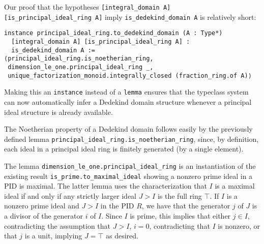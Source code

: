 \documentclass[a4paper,USenglish,cleveref, autoref, thm-restate]{lipics-v2021}
\newcommand{\lean}[1]{\texttt{#1}\xspace} %
\begin{document}
Our proof that the hypotheses \lean{[integral\_domain A] [is\_principal\_ideal\_ring A]} imply \lean{is\_dedekind\_domain A} is relatively short:
\begin{lstlisting}
instance principal_ideal_ring.to_dedekind_domain (A : Type*)
  [integral_domain A] [is_principal_ideal_ring A] :
  is_dedekind_domain A :=
⟨principal_ideal_ring.is_noetherian_ring,
 dimension_le_one.principal_ideal_ring _,
 unique_factorization_monoid.integrally_closed (fraction_ring.of A)⟩
\end{lstlisting}

Making this an \lean{instance} instead of a \lean{lemma} ensures that the typeclass system can now automatically infer a Dedekind domain structure whenever a principal ideal structure is already available.

The Noetherian property of a Dedekind domain follows easily by the previously defined lemma \lean{principal\_ideal\_ring.is\_noetherian\_ring}, since, by definition, each ideal in a principal ideal ring is finitely generated (by a single element).

The lemma \lean{dimension\_le\_one.principal\_ideal\_ring} is an instantiation of the existing result \lean{is\_prime.to\_maximal\_ideal} showing a nonzero prime ideal in a PID is maximal.
The latter lemma uses the characterization that $I$ is a maximal ideal if and only if any strictly larger ideal $J > I$ is the full ring $\top$.
If $I$ is a nonzero prime ideal and $J > I$ in the PID $R$, we have that the generator $j$ of $J$ is a divisor of the generator $i$ of $I$. Since $I$ is prime, this implies that either $j \in I$, contradicting the assumption that $J > I$, $i = 0$, contradicting that $I$ is nonzero, or that $j$ is a unit, implying $J = \top$ as desired.
\end{document}
